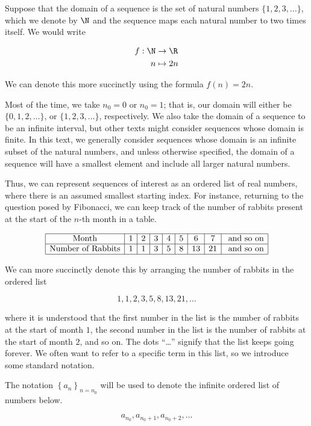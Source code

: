 \documentclass{ximera}
\begin{document}
\begin{example}
Suppose that the domain of a sequence is the set of natural numbers $\{1,2,3,\ldots\}$, which we denote by $\N$ and the sequence maps each natural number to two times itself.  We would write

\begin{align*}
f : \N & \to \R \\
    n &\mapsto 2n
\end{align*}

We can denote this more succinctly using the formula $f(n)=2n$.
\end{example}

Most of the time, we take $n_0=0$ or $n_0=1$; that is, our domain will either be $\{0,1,2,\ldots\}$, or $\{1,2,3,\ldots\}$, respectively.  We also take the domain of a sequence to be an infinite interval, but other texts might consider sequences whose domain is finite. In this text, we generally consider sequences whose domain is an infinite subset of the natural numbers, and unless otherwise specified, the domain of a sequence will have a smallest element and include all larger natural numbers.

Thus, we can represent sequences of interest as an ordered list of real numbers, where there is an assumed smallest starting index.  For instance, returning to the question posed by Fibonacci, we can keep track of the number of rabbits present at the start of the $n$-th month in a table.

\[
\begin{array}{| c | c | c | c | c | c| c| c| c| }
\hline
\textrm{Month} & 1 & 2 & 3 & 4 & 5 & 6 & 7 & \textrm{ and so on} \\
\hline
\textrm{Number of Rabbits} & 1 & 1 & 3 & 5 & 8 &13 &21 & \textrm{ and so on} \\
\hline
\end{array}
\]

We can more succinctly denote this by arranging the number of rabbits in the ordered list


\[
1,1,2,3,5,8,13,21, \ldots 
\]

where it is understood that the first number in the list is the number of rabbits at the start of month $1$, the second number in the list is the number of rabbits at the start of month $2$, and so on.  The dots ``\ldots'' signify that the list keeps going forever.  We often want to refer to a specific term in this list, so we introduce some standard notation.

\begin{definition} The notation $\left\{a_n\right\}_{n=n_0}$ will be used to denote the infinite ordered list of numbers below.

\[
a_{n_0}, a_{n_0+1},  a_{n_0+2}, \ldots
\]

\end{definition}
\end{document}
